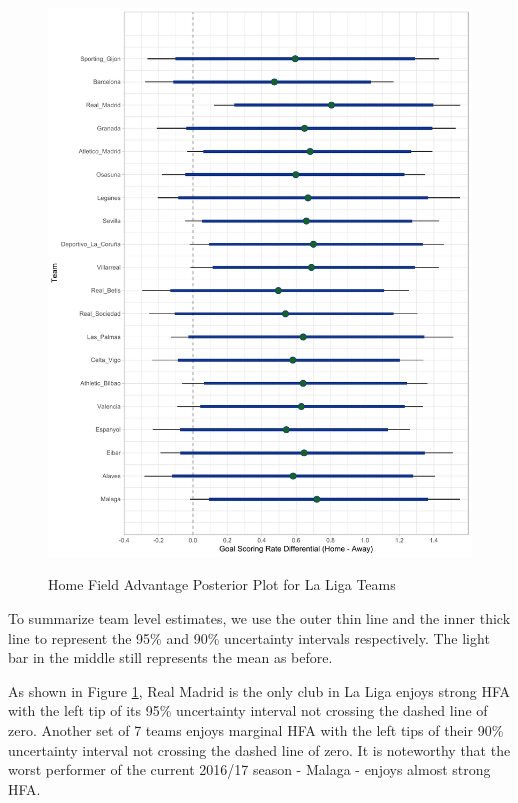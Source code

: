 \documentclass[USenglish]{article}
\begin{document}
\begin{figure}
\caption{Home Field Advantage Posterior Plot for La Liga Teams}
{\includegraphics[width=0.90\linewidth]{HFA_La_Liga11.pdf}}
\label{fig32}
\end{figure}

To summarize team level estimates, we use the outer thin line and the inner thick line to represent the 95\% and 90\% uncertainty intervals respectively. The light bar in the middle still represents the mean as before.


As shown in Figure \ref{fig32}, Real Madrid is the only club in La Liga enjoys strong HFA with the left tip of its 95\% uncertainty interval not crossing the dashed line of zero. Another set of 7 teams enjoys marginal HFA with the left tips of their 90\% uncertainty interval not crossing the dashed line of zero. It is noteworthy that the worst performer of the current 2016/17 season - Malaga - enjoys almost strong HFA.     
\end{document}
